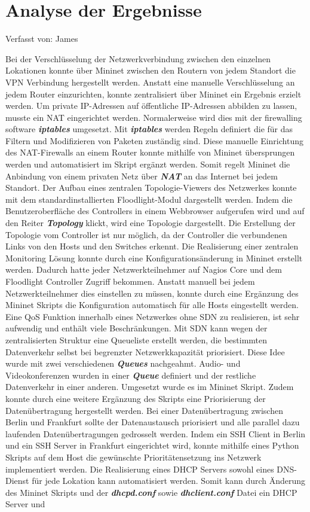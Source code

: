 \documentclass[fontsize=12pt,paper=a4,open=any,parskip=half,
  twoside=false,toc=listof,toc=bibliography,fleqn,leqno,
  captions=nooneline,captions=tableabove,british]{scrbook}
\begin{document}
{\section{Analyse der Ergebnisse}
{\tiny Verfasst von: James\par}
Bei der Verschlüsselung der Netzwerkverbindung zwischen den einzelnen Lokationen konnte über Mininet zwischen den Routern von jedem Standort die VPN Verbindung hergestellt werden. Anstatt eine manuelle Verschlüsselung an jedem Router einzurichten, konnte zentralisiert über Mininet ein Ergebnis erzielt werden. Um private IP-Adressen auf öffentliche IP-Adressen abbilden zu lassen, musste ein NAT eingerichtet werden. Normalerweise wird dies mit der firewalling software \textit{\textbf{iptables}} umgesetzt. Mit \textit{\textbf{iptables}} werden Regeln definiert die für das Filtern und Modifizieren von Paketen zuständig sind. Diese manuelle Einrichtung des NAT-Firewalls an einem Router konnte mithilfe von Mininet übersprungen werden und automatisiert im Skript ergänzt werden. Somit regelt Mininet die Anbindung von einem privaten Netz über \textit{\textbf{NAT}} an das Internet bei jedem Standort. Der Aufbau eines zentralen Topologie-Viewers des Netzwerkes konnte mit dem standardinstallierten Floodlight-Modul dargestellt werden. Indem die Benutzeroberfläche des Controllers in einem Webbrowser aufgerufen wird und auf den Reiter \textit{\textbf{Topology}} klickt, wird eine Topologie dargestellt. Die Erstellung der Topologie vom Controller ist nur möglich, da der Controller die verbundenen Links von den Hosts und den Switches erkennt. Die Realisierung einer zentralen Monitoring Lösung konnte durch eine Konfigurationsänderung in Mininet erstellt werden. Dadurch hatte jeder Netzwerkteilnehmer auf Nagios Core und dem Floodlight Controller Zugriff bekommen. Anstatt manuell bei jedem Netzwerkteilnehmer dies einstellen zu müssen, konnte durch eine Ergänzung des Mininet Skripts die Konfiguration automatisch für alle Hosts eingestellt werden. Eine QoS Funktion innerhalb eines Netzwerkes ohne SDN zu realisieren, ist sehr aufwendig und enthält viele Beschränkungen. Mit SDN kann wegen der zentralisierten Struktur eine Queueliste erstellt werden, die bestimmten Datenverkehr selbst bei begrenzter Netzwerkkapazität priorisiert. Diese Idee wurde mit zwei verschiedenen \textit{\textbf{Queues}} nachgeahmt. Audio- und Videokonferenzen wurden in einer \textit{\textbf{Queue}} definiert und der restliche Datenverkehr in einer anderen. Umgesetzt wurde es im Mininet Skript. Zudem konnte durch eine weitere Ergänzung des Skripts eine Priorisierung der Datenübertragung hergestellt werden. Bei einer Datenübertragung zwischen Berlin und Frankfurt sollte der Datenaustausch priorisiert und alle parallel dazu laufenden Datenübertragungen gedrosselt werden. Indem ein SSH Client in Berlin und ein SSH Server in Frankfurt eingerichtet wird, konnte mithilfe eines Python Skripts auf dem Host die gewünschte Prioritätensetzung ins Netzwerk implementiert werden. Die Realisierung eines DHCP Servers sowohl eines DNS-Dienst für jede Lokation kann automatisiert werden. Somit kann durch Änderung des Mininet Skripts und der \textit{\textbf{dhcpd.conf}} sowie \textit{\textbf{dhclient.conf}} Datei ein DHCP Server und }
\end{document}
